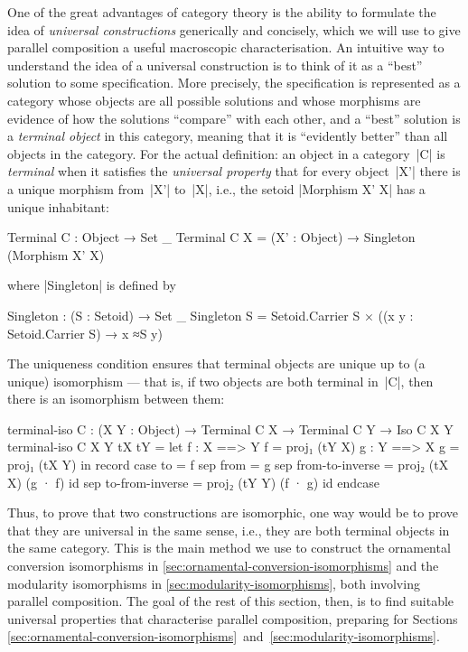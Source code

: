 One of the great advantages of category theory is the ability to formulate the idea of \emph{universal constructions} generically and concisely, which we will use to give parallel composition a useful macroscopic characterisation.
An intuitive way to understand the idea of a universal construction is to think of it as a ``best'' solution to some specification.
More precisely, the specification is represented as a category whose objects are all possible solutions and whose morphisms are evidence of how the solutions ``compare'' with each other, and a ``best'' solution is a \emph{terminal object} in this category, meaning that it is ``evidently better'' than all objects in the category.
For the actual definition: an object in a category~|C| is \emph{terminal} when it satisfies the \emph{universal property} that for every object~|X'| there is a unique morphism from~|X'| to~|X|, i.e., the setoid |Morphism X' X| has a unique inhabitant:
\begin{code}
Terminal C : Object → Set _
Terminal C X = (X' : Object) → Singleton (Morphism X' X)
\end{code}
where |Singleton| is defined by
\begin{code}
Singleton : (S : Setoid) → Set _
Singleton S = Setoid.Carrier S × ((x y : Setoid.Carrier S) → x ≈S y)
\end{code}
The uniqueness condition ensures that terminal objects are unique up to (a unique) isomorphism --- that is, if two objects are both terminal in~|C|, then there is an isomorphism between them:
\begin{code}
terminal-iso C : (X Y : Object) → Terminal C X → Terminal C Y → Iso C X Y
terminal-iso C X Y tX tY =
  let  f : X ==> Y
       f = proj₁ (tY  X)
       g : Y ==> X
       g = proj₁ (tX  Y)
  in   record  case  to    = f
               sep   from  = g
               sep   from-to-inverse  = proj₂ (tX  X)  (g · f) id
               sep   to-from-inverse  = proj₂ (tY  Y)  (f · g) id endcase
\end{code}
Thus, to prove that two constructions are isomorphic, one way would be to prove that they are universal in the same sense, i.e., they are both terminal objects in the same category.
This is the main method we use to construct the ornamental conversion isomorphisms in \autoref{sec:ornamental-conversion-isomorphisms} and the modularity isomorphisms in \autoref{sec:modularity-isomorphisms}, both involving parallel composition.
The goal of the rest of this section, then, is to find suitable universal properties that characterise parallel composition, preparing for Sections \ref{sec:ornamental-conversion-isomorphisms}~and~\ref{sec:modularity-isomorphisms}.


